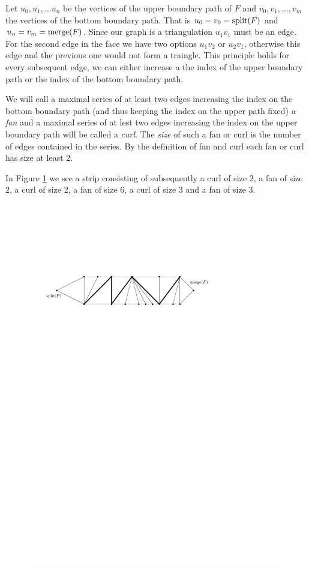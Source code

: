  Let $u_0 , u_1, \ldots u_n$ be the vertices of the upper boundary path of $F$ and $v_0, v_1, \ldots, v_m$ the vertices of the bottom boundary path. That is $u_0=v_0 = \operatorname{split}(F)$ and $u_n = v_m = \operatorname{merge}(F)$. Since our graph is a triangulation $u_1v_1$ must be an edge. For the second edge in the face we have two options $u_1v_2$ or $u_2v_1$, otherwise this edge and the previous one would not form a traingle. This principle holds for every subsequent edge, we can either increase a the index of the upper boundary path or the index of the bottom boundary path.

 We will call a maximal series of at least two edges increasing the index on the bottom boundary path (and thus keeping the index on the upper path fixed) a \emph{fan} and a maximal series of at lest two edges increasing the index on the upper boundary path will be called a \emph{curl}. The \emph{size} of such a fan or curl is the number of edges contained in the series. By the definition of fan and curl each fan or curl has size at least $2$.

 In Figure \ref{fig:uni:fansandcurls} we see a strip consisting of subsequently a curl of size $2$, a fan of size 2, a curl of size $2$, a fan of size $6$, a curl of size $3$ and a fan of size $3$.

 \begin{figure}[h]
   \centering
   \includegraphics[scale=.9]{unifiedAlgo/img/fansandcurls}
   \caption{}
   \label{fig:uni:fansandcurls}
 \end{figure}


